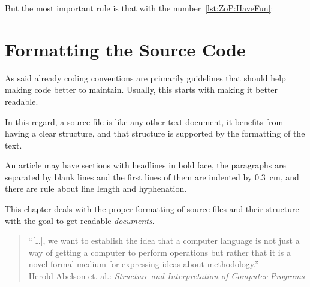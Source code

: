 \documentclass[11pt,a4paper, titlepage, parskip=half, headsepline, footsepline, cleardoublepage=current, headheight=1cm]{scrbook}
\begin{document}
But the most important rule is that with the number~\ref{lst:ZoP:HaveFun}:

\begin{center}
	\begin{huge}
	\end{huge}
\end{center}


\chapter{Formatting the Source Code}\label{sec:FormattingTheSourceCode}
As said already coding conventions are primarily guidelines that should help making code better to maintain. Usually, this starts with making it better readable.

In this regard, a source file is like any other text document, it benefits from having a clear structure, and that structure is supported by the formatting of the text.

An article may have sections with headlines in bold face, the paragraphs are separated by blank lines and the first lines of them are indented by 0.3~cm, and there are rule about line length and hyphenation.

This chapter deals with the proper formatting of source files and their structure with the goal to get readable \textit{documents}.

\begin{quotation}
“[…], we want to establish the idea that a computer language is not just a way of getting a computer to perform operations but rather that it is a novel formal medium for expressing ideas
about methodology.”\\
Herold Abelson et. al.: \textit{Structure and Interpretation of Computer Programs}
\autocite{Sussman:StructureAndInterpretationOfComputerPrograms}
\end{quotation}
\end{document}

